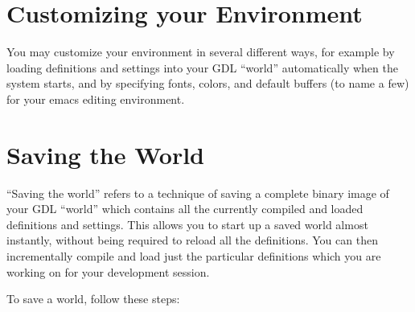 \documentclass [11pt]{book}
\begin{document}
\section{Customizing your Environment}

\label{sec:customizingyourenvironment}

 You may customize your environment in several different ways,
for example by loading definitions and settings into your GDL
``world'' automatically when the system starts, and by specifying
fonts, colors, and default buffers (to name a few) for your emacs
editing environment.

\section{Saving the World}

\label{sec:savingtheworld}

``Saving the world'' refers to a technique of saving a complete
binary image of your GDL ``world'' which contains all the currently
compiled and loaded definitions and settings.  This allows you to
start up a saved world almost instantly, without being required to
reload all the definitions. You can then incrementally compile and
load just the particular definitions which you are working on for your
development session.

To save a world, follow these steps:
\end{document}
